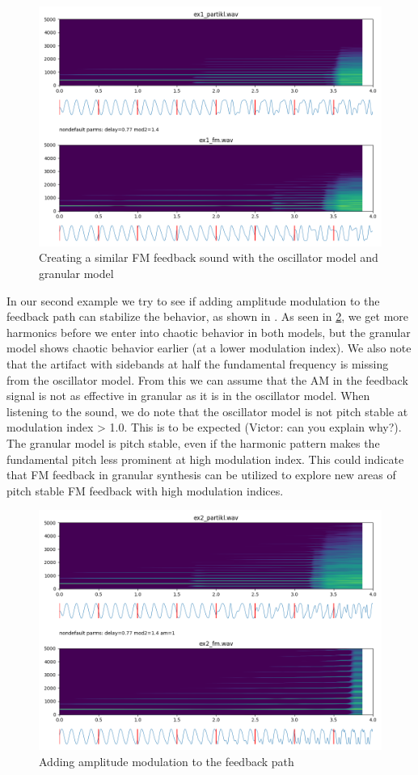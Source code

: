 \documentclass[runningheads,a4paper]{llncs}
\begin{document}
\begin{figure}
	\centering
	\includegraphics[width=.95\textwidth]{ex1_compare.png}
	\caption{Creating a similar FM feedback sound with the oscillator model and granular model}
	\label{fig:ex1}
\end{figure}

In our second example we try to see if adding amplitude modulation to the feedback path can stabilize the behavior, as shown in \cite{Lazzarini-2024}. As seen in \ref{fig:ex2}, we get more harmonics before we enter into chaotic behavior in both models, but the granular model shows chaotic behavior earlier (at a lower modulation index). We also note that the artifact with sidebands at half the fundamental frequency is missing from the oscillator model. From this we can assume that the AM in the feedback signal is not as effective in granular as it is in the oscillator model. When listening to the sound, we do note that the oscillator model is not pitch stable at modulation index > 1.0. This is to be expected (Victor: can you explain why?). The granular model is pitch stable, even if the harmonic pattern makes the fundamental pitch less prominent at high modulation index. This could indicate that FM feedback in granular synthesis can be utilized to explore new areas of pitch stable FM feedback with high modulation indices.

\begin{figure}
	\centering
	\includegraphics[width=.95\textwidth]{ex2_compare.png}
	\caption{Adding amplitude modulation to the feedback path}
	\label{fig:ex2}
\end{figure}
\end{document}
